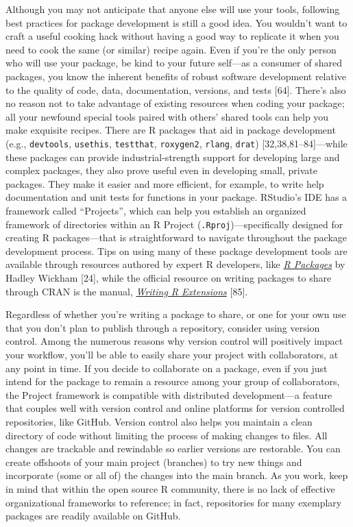 \documentclass[10pt,letterpaper]{article}
\begin{document}
Although you may not anticipate that anyone else will use your tools,
following best practices for package development is still a good idea.
You wouldn't want to craft a useful cooking hack without having a good
way to replicate it when you need to cook the same (or similar) recipe
again. Even if you're the only person who will use your package, be kind
to your future self---as a consumer of shared packages, you know the
inherent benefits of robust software development relative to the quality
of code, data, documentation, versions, and tests {[}64{]}. There's also
no reason not to take advantage of existing resources when coding your
package; all your newfound special tools paired with others' shared
tools can help you make exquisite recipes. There are R packages that aid
in package development (e.g., \texttt{devtools}, \texttt{usethis},
\texttt{testthat}, \texttt{roxygen2}, \texttt{rlang}, \texttt{drat})
{[}32,38,81--84{]}---while these packages can provide
industrial-strength support for developing large and complex packages,
they also prove useful even in developing small, private packages. They
make it easier and more efficient, for example, to write help
documentation and unit tests for functions in your package. RStudio's
IDE has a framework called ``Projects'', which can help you establish an
organized framework of directories within an R Project
(\texttt{.Rproj})---specifically designed for creating R packages---that
is straightforward to navigate throughout the package development
process. Tips on using many of these package development tools are
available through resources authored by expert R developers, like
\href{https://r-pkgs.org/}{\emph{R Packages}} by Hadley Wickham
{[}24{]}, while the official resource on writing packages to share
through CRAN is the manual,
\href{https://cran.r-project.org/doc/manuals/r-release/R-exts.html}{\emph{Writing
R Extensions}} {[}85{]}.

Regardless of whether you're writing a package to share, or one for your
own use that you don't plan to publish through a repository, consider
using version control. Among the numerous reasons why version control
will positively impact your workflow, you'll be able to easily share
your project with collaborators, at any point in time. If you decide to
collaborate on a package, even if you just intend for the package to
remain a resource among your group of collaborators, the Project
framework is compatible with distributed development---a feature that
couples well with version control and online platforms for version
controlled repositories, like GitHub. Version control also helps you
maintain a clean directory of code without limiting the process of
making changes to files. All changes are trackable and rewindable so
earlier versions are restorable. You can create offshoots of your main
project (branches) to try new things and incorporate (some or all of)
the changes into the main branch. As you work, keep in mind that within
the open source R community, there is no lack of effective
organizational frameworks to reference; in fact, repositories for many
exemplary packages are readily available on GitHub.
\end{document}
